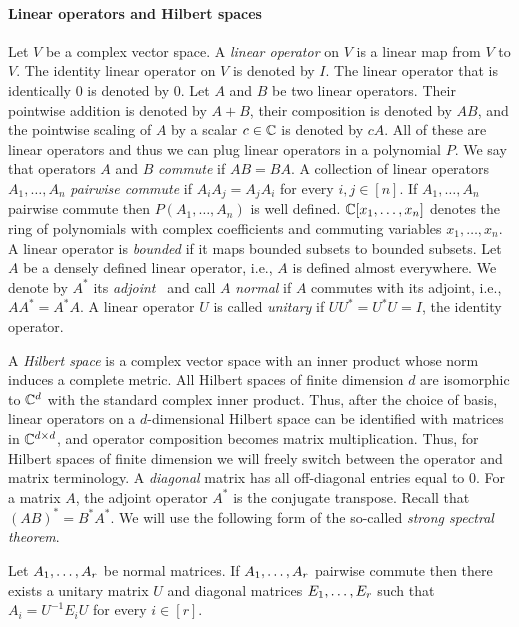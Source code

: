 \documentclass[11pt,letter]{article}
\begin{document}
\paragraph{Linear operators and Hilbert spaces}
Let $V$ be a complex vector space. A \emph{linear operator} on $V$ is a linear
map from $V$ to $V$. The identity linear operator on $V$ is denoted by $I$. The
linear operator that is identically $0$ is denoted by $0$. 
Let $A$ and $B$ be two linear operators. Their pointwise addition is denoted by $A+B$, their
composition is denoted by $AB$, and the pointwise scaling of $A$ by a scalar
$c\in{\mathbb C}$ is denoted by $cA$. All of these are linear operators and thus we can
plug linear operators in a polynomial $P$. 
We say that operators $A$ and $B$ \emph{commute} if
$AB=BA$. A collection of linear operators $A_1,\ldots,A_n$ \emph{pairwise commute} if $A_iA_j=A_jA_i$ for every $i,j\in [n]$. 
If $A_1,\ldots,A_n$ pairwise commute then $P(A_1,\ldots,A_n)$ is well defined.
${\mathbb C}[x_1,\ldots,x_n]$ denotes the ring of polynomials with complex coefficients and commuting variables $x_1,\ldots,x_n$. 
A linear operator is \emph{bounded} if it maps bounded subsets to bounded
subsets. Let $A$ be a densely defined linear operator, i.e., $A$ is defined
almost everywhere. We denote by $A^*$ its \emph{adjoint}~\cite{Folland94}
and call $A$ \emph{normal} if $A$ commutes with its adjoint, i.e., $AA^*=A^*A$.
A linear operator $U$ is called \emph{unitary} if $UU^*=U^*U=I$, the identity
operator.

A \emph{Hilbert space} is a complex vector space with an inner product whose
norm induces a complete metric.
All Hilbert spaces of finite dimension $d$ are
isomorphic to ${\mathbb C}^d$ with the standard complex inner product. Thus, 
after the choice of basis, linear operators on a $d$-dimensional Hilbert space
can be identified with matrices in ${\mathbb C}^{d\times d}$, and operator composition
becomes matrix multiplication. 
Thus, for Hilbert spaces of finite dimension we will
freely switch between the operator and matrix terminology.
A \emph{diagonal} matrix has all off-diagonal
entries equal to $0$. 
For a matrix $A$, the adjoint operator $A^*$ is the conjugate transpose.
Recall that $(AB)^*=B^*A^*$.
We will use the following form of the so-called \emph{strong spectral
theorem}.
\begin{theorem}
\label{the:SST}
Let $A _1,\ldots, A _{r}$ be normal matrices. If $A _1,\ldots, A _{r}$ pairwise
commute then there exists a unitary matrix $U$ and diagonal matrices 
$E _1,\ldots, E _{r}$ such that $A_i=U^{-1}E_iU$ for every $i\in[r]$.
\end{theorem}
\end{document}
